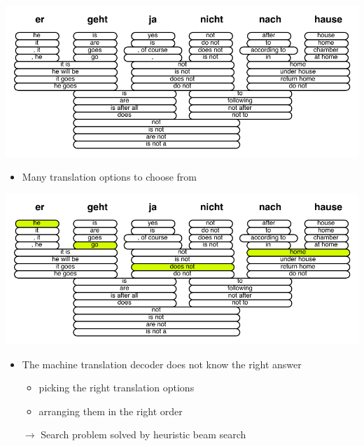 \documentclass[landscape]{uedslides2C}
\begin{document}
\vspace{-5mm}
\begin{center} 
\includegraphics[scale=1.5]{translation-options.pdf}
\end{center}\vspace{-10mm}
\begin{itemize}
\item Many translation options to choose from
\end{itemize}


\vspace{-5mm}
\begin{center} 
\includegraphics[scale=1.5]{translation-options-correct.pdf}
\end{center}  \vspace{-12mm}
\begin{itemize}
\item The machine translation decoder does not know the right answer\vspace{-4mm}
\begin{itemize}
\item picking the right translation options
\item arranging them in the right order \vspace{-6mm}
\end{itemize}
\item[$\rightarrow$] Search problem solved by heuristic beam search
\end{itemize}
\end{document}
